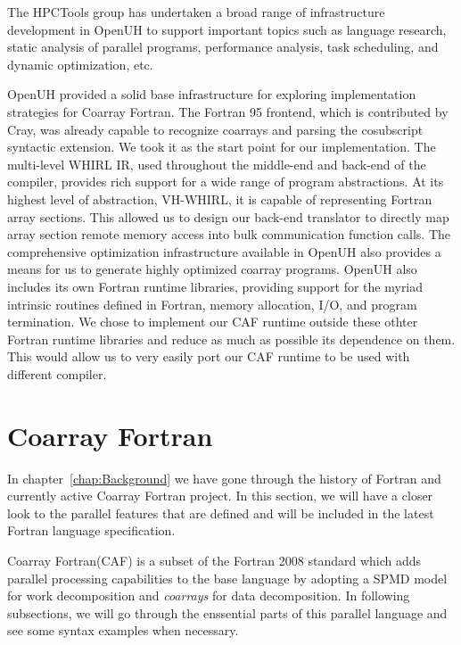 The HPCTools group has undertaken a broad range of infrastructure development in OpenUH to support important topics such as language research, static analysis of parallel programs, performance analysis, task scheduling, and dynamic optimization, etc.

OpenUH provided a solid base infrastructure for exploring implementation strategies for Coarray Fortran. The Fortran 95 frontend, which is contributed by Cray, was already capable to recognize coarrays and parsing the cosubscript syntactic extension. We took it as the start point for our implementation. The multi-level WHIRL IR, used throughout the middle-end and back-end of the compiler, provides rich support for a wide range of program abstractions. At its highest level of abstraction, VH-WHIRL, it is capable of representing Fortran array sections. This allowed us to design our back-end translator to directly map array section remote memory access into bulk communication function calls. The comprehensive optimization infrastructure available in OpenUH also provides a means for us to generate highly optimized coarray programs. OpenUH also includes its own Fortran runtime libraries, providing support for the myriad intrinsic routines defined in Fortran, memory allocation, I/O, and program termination. We chose to implement our CAF runtime outside these othter Fortran runtime libraries and reduce as much as possible its dependence on them. This would allow us to very easily port our CAF runtime to be used with different compiler.

\section{Coarray Fortran}\label{sec:coarrays}
In chapter~\ref{chap:Background} we have gone through the history of Fortran and currently active Coarray Fortran project. In this section, we will have a closer look to the parallel features that are defined and will be included in the latest Fortran language specification. 

Coarray Fortran(CAF) is a subset of the Fortran 2008 standard which adds parallel processing capabilities to the base language by adopting a SPMD model for work decomposition and \emph{coarrays} for data decomposition. In following subsections, we will go through the enssential parts of this parallel language and see some syntax examples when necessary. 

